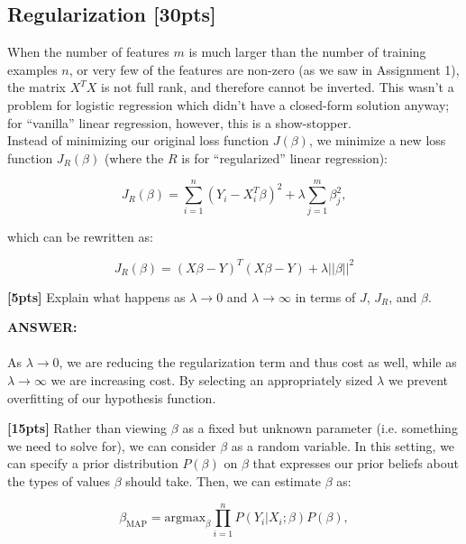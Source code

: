 \documentclass[paper=a4, fontsize=11pt]{scrartcl} %
\numberwithin{figure}{section} %
\numberwithin{table}{section} %
\begin{document}
\subsection{Regularization \textbf{[30pts]}}

When the number of features $m$ is much larger than the number of training examples $n$, or very few of the features are non-zero (as we saw in Assignment 1), the matrix $X^TX$ is not full rank, and therefore cannot be inverted. This wasn't a problem for logistic regression which didn't have a closed-form solution anyway; for ``vanilla'' linear regression, however, this is a show-stopper. \\

Instead of minimizing our original loss function $J(\beta)$, we minimize a new loss function $J_R(\beta)$ (where the $R$ is for ``regularized'' linear regression):

$$
J_R(\beta) = \sum_{i = 1}^n (Y_i - X_i^T \beta)^2 + \lambda \sum_{j = 1}^m \beta_j^2,
$$

which can be rewritten as:

\begin{equation}
J_R(\beta) = (X\beta - Y)^T(X\beta - Y) + \lambda ||\beta||^2
\label{eq:reg}
\end{equation}

\textbf{[5pts]} Explain what happens as $\lambda \rightarrow 0$ and $\lambda \rightarrow \infty$ in terms of $J$, $J_R$, and $\beta$. \\

\begin{addmargin}[2em]{2em}
  \textbf{ANSWER:}\\\\
  As $\lambda \rightarrow 0$, we are reducing the regularization term and thus cost as well, while as $\lambda \rightarrow \infty$ we are increasing cost. By selecting an appropriately sized $\lambda$ we prevent overfitting of our hypothesis function.
  \\
\end{addmargin}

\textbf{[15pts]} Rather than viewing $\beta$ as a fixed but unknown parameter (i.e. something we need to solve for), we can consider $\beta$ as a random variable. In this setting, we can specify a prior distribution $P(\beta)$ on $\beta$ that expresses our prior beliefs about the types of values $\beta$ should take. Then, we can estimate $\beta$ as:

\begin{equation}
\beta_{\textrm{MAP}} = \textrm{argmax}_{\beta} \prod_{i = 1}^n P(Y_i | X_i; \beta) P(\beta),
\label{eq:map}
\end{equation}
\end{document}
